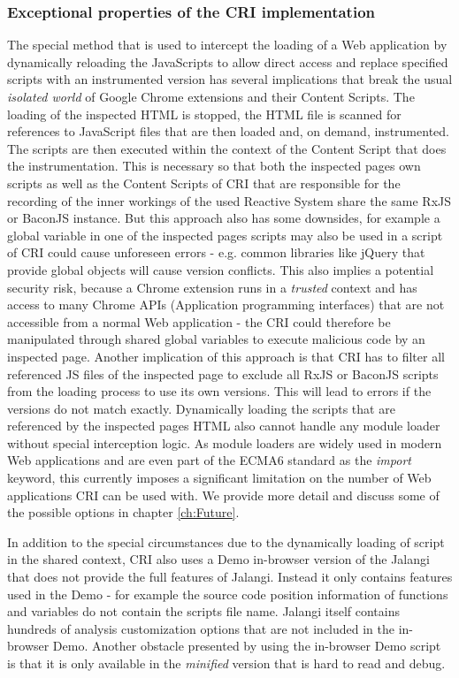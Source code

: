 	\subsubsection{Exceptional properties of the CRI implementation}
	The special method that is used to intercept the loading of a Web application by dynamically reloading the JavaScripts to allow direct access and replace specified scripts with an instrumented version has several implications that break the usual \emph{isolated world} \cite{GoogleApiContentScripts} of Google Chrome extensions and their Content Scripts. The loading of the inspected HTML is stopped, the HTML file is scanned for references to JavaScript files that are then loaded and, on demand, instrumented. The scripts are then executed within the context of the Content Script that does the instrumentation. This is necessary so that both the inspected pages own scripts as well as the Content Scripts of CRI that are responsible for the recording of the inner workings of the used Reactive System share the same RxJS or BaconJS instance. But this approach also has some downsides, for example a global variable in one of the inspected pages scripts may also be used in a script of CRI could cause unforeseen errors - e.g. common libraries like jQuery \cite{jQuery} that provide global objects will cause version conflicts. This also implies a potential security risk, because a Chrome extension runs in a \emph{trusted} context and has access to many Chrome APIs (Application programming interfaces) that are not accessible from a normal Web application - the CRI could therefore be manipulated through shared global variables to execute malicious code by an inspected page.
	Another implication of this approach is that CRI has to filter all referenced JS files of the inspected page to exclude all RxJS or BaconJS scripts from the loading process to use its own versions. This will lead to errors if the versions do not match exactly.
	Dynamically loading the scripts that are referenced by the inspected pages HTML also cannot handle any module loader without special interception logic. As module loaders are widely used in modern Web applications and are even part of the ECMA6 \cite{ECMA6import} standard as the \emph{import} keyword, this currently imposes a significant limitation on the number of Web applications CRI can be used with. We provide more detail and discuss some of the possible options in chapter \ref{ch:Future}.
	
	
	In addition to the special circumstances due to the dynamically loading of script in the shared context, CRI also uses a Demo \cite{JalangiDemo} in-browser version of the Jalangi \cite{Jalangi} that does not provide the full features of Jalangi. Instead it only contains features used in the Demo - for example the source code position information of functions and variables do not contain the scripts file name. Jalangi itself contains hundreds of analysis customization options that are not included in the in-browser Demo. Another obstacle presented by using the in-browser Demo script is that it is only available in the \emph{minified} version that is hard to read and debug.
	
